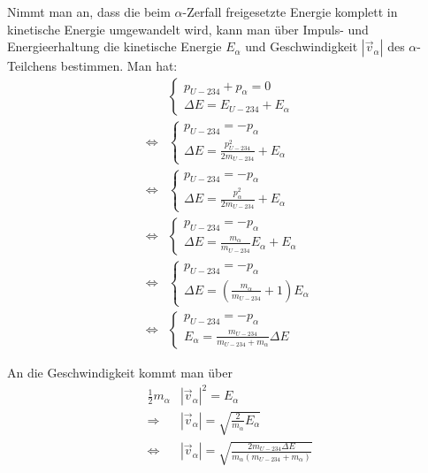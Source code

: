 \documentclass[12pt]{article}
\begin{document}
Nimmt man an, dass die beim $\alpha$-Zerfall freigesetzte Energie komplett in kinetische Energie umgewandelt wird, kann man über Impuls- und Energieerhaltung die kinetische Energie $E_\alpha$ und Geschwindigkeit $|\vec{v}_\alpha|$ des $\alpha$-Teilchens bestimmen.
Man hat:
\begin{align*}
    &\begin{cases}
    p_{U-234} + p_{\alpha} = 0 \\
    \Delta E = E_{U-234} + E_\alpha
    \end{cases} \\
    \Leftrightarrow &\begin{cases}
    p_{U-234} = - p_{\alpha} \\
    \Delta E = \frac{p_{U-234}^2}{2m_{U-234}} + E_\alpha
    \end{cases} \\
    \Leftrightarrow &\begin{cases}
    p_{U-234} = - p_{\alpha} \\
    \Delta E = \frac{p_{\alpha}^2}{2m_{U-234}} + E_\alpha
    \end{cases} \\
    \Leftrightarrow &\begin{cases}
    p_{U-234} = - p_{\alpha} \\
    \Delta E = \frac{m_{\alpha}}{m_{U-234}} E_\alpha + E_\alpha
    \end{cases} \\ 
    \Leftrightarrow &\begin{cases}
    p_{U-234} = - p_{\alpha} \\
    \Delta E = \left(\frac{m_{\alpha}}{m_{U-234}} + 1 \right) E_\alpha
    \end{cases} \\
    \Leftrightarrow &\begin{cases}
    p_{U-234} = - p_{\alpha} \\
    E_\alpha = \frac{m_{U-234}}{m_{U-234} + m_\alpha} \Delta E
    \end{cases} 
\end{align*}

An die Geschwindigkeit kommt man über
\begin{align*}
    \frac{1}{2} m_\alpha &|\vec{v}_\alpha|^2 = E_\alpha \\
    \Rightarrow &|\vec{v}_\alpha| = \sqrt{\frac{2}{m_\alpha} E_\alpha} \\
    \Leftrightarrow &|\vec{v}_\alpha| = \sqrt{\frac{2 m_{U-234} \Delta E}{m_\alpha (m_{U-234} + m_\alpha)}}
\end{align*}
\end{document}
